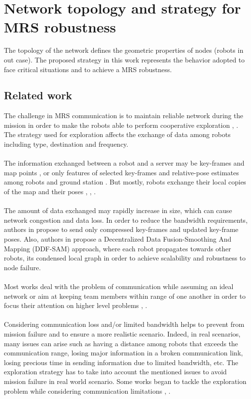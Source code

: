 \documentclass[11pt,openany]{book}
\begin{document}
\section{Network topology and strategy for MRS robustness}
The topology of the network defines the geometric properties of nodes (robots in out case). The proposed strategy in this work represents the behavior adopted to face critical situations and to achieve a MRS robustness.
\subsection{Related work}
The challenge in MRS communication is to maintain reliable network during the mission in order to make the robots able to perform cooperative exploration \cite{rooker2007multi}, \cite{gupta2015survey}. The strategy used for exploration affects the exchange of data among robots including type, destination and frequency.\\\\
The information exchanged between a robot and a server may be key-frames and map points \cite{schmuck2017multi}, or only features of selected key-frames and relative-pose estimates among robots and ground station \cite{forster2013collaborative}. But mostly, robots exchange their local copies of the map and their poses \cite{fox2006distributed}, \cite{bresson2015general}, \cite{schuster2015multi}.\\\\
The amount of data exchanged may rapidly increase in size, which can cause network congestion and data loss. In order to reduce the bandwidth requirements, authors in \cite{mohanarajah2015cloud} propose to send only compressed key-frames and updated key-frame poses. Also, authors in \cite{cunningham2010ddf} propose a Decentralized Data Fusion-Smoothing And Mapping (DDF-SAM) approach, where each robot propagates towards other robots, its condensed local graph in order to achieve scalability and robustness to node failure.\\\\
Most works deal with the problem of communication while assuming an ideal network or aim at keeping team members within range of one another in order to focus their attention on higher level problems \cite{scherer2015autonomous}, \cite{burgard2005coordinated}.\\\\
Considering communication loss and/or limited bandwidth helps to prevent from mission failure and to ensure a more realistic scenario. Indeed, in real scenarios, many issues can arise such as having a distance among robots that exceeds the communication range, losing major information in a broken communication link, losing precious time in sending information due to limited bandwidth, etc. The exploration strategy has to take into account the mentioned issues to avoid mission failure in real world scenario. Some works began to tackle the exploration problem while considering communication limitations \cite{couceiro2014darwinian}, \cite{schmuck2017multi}.\\\\
\end{document}
